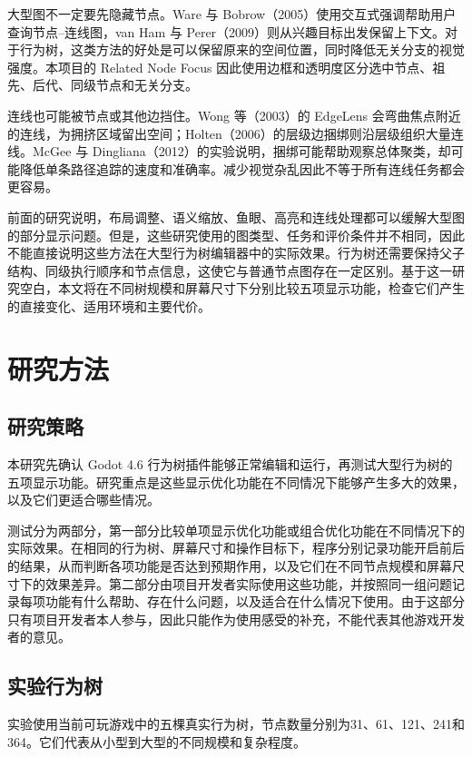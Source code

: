 \documentclass[11pt,a4paper,oneside,extrafontsizes]{memoir}
\begin{document}
大型图不一定要先隐藏节点。Ware 与 Bobrow（2005）使用交互式强调帮助用户查询节点–连线图，van Ham 与 Perer（2009）则从兴趣目标出发保留上下文。对于行为树，这类方法的好处是可以保留原来的空间位置，同时降低无关分支的视觉强度。本项目的 Related Node Focus 因此使用边框和透明度区分选中节点、祖先、后代、同级节点和无关分支。

连线也可能被节点或其他边挡住。Wong 等（2003）的 EdgeLens 会弯曲焦点附近的连线，为拥挤区域留出空间；Holten（2006）的层级边捆绑则沿层级组织大量连线。McGee 与 Dingliana（2012）的实验说明，捆绑可能帮助观察总体聚类，却可能降低单条路径追踪的速度和准确率。减少视觉杂乱因此不等于所有连线任务都会更容易。

前面的研究说明，布局调整、语义缩放、鱼眼、高亮和连线处理都可以缓解大型图的部分显示问题。但是，这些研究使用的图类型、任务和评价条件并不相同，因此不能直接说明这些方法在大型行为树编辑器中的实际效果。行为树还需要保持父子结构、同级执行顺序和节点信息，这使它与普通节点图存在一定区别。基于这一研究空白，本文将在不同树规模和屏幕尺寸下分别比较五项显示功能，检查它们产生的直接变化、适用环境和主要代价。

\chapter{研究方法}

\section{研究策略}

本研究先确认 Godot 4.6 行为树插件能够正常编辑和运行，再测试大型行为树的五项显示功能。研究重点是这些显示优化功能在不同情况下能够产生多大的效果，以及它们更适合哪些情况。

测试分为两部分，第一部分比较单项显示优化功能或组合优化功能在不同情况下的实际效果。在相同的行为树、屏幕尺寸和操作目标下，程序分别记录功能开启前后的结果，从而判断各项功能是否达到预期作用，以及它们在不同节点规模和屏幕尺寸下的效果差异。第二部分由项目开发者实际使用这些功能，并按照同一组问题记录每项功能有什么帮助、存在什么问题，以及适合在什么情况下使用。由于这部分只有项目开发者本人参与，因此只能作为使用感受的补充，不能代表其他游戏开发者的意见。

\section{实验行为树}

实验使用当前可玩游戏中的五棵真实行为树，节点数量分别为31、61、121、241和364。它们代表从小型到大型的不同规模和复杂程度。
\end{document}
